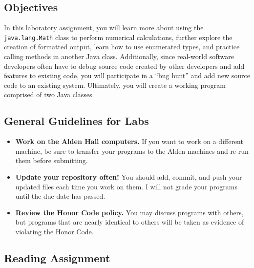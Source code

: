 



\subsection*{Objectives}

In this laboratory assignment, you will learn more about using the {\tt java.lang.Math} class to perform numerical
calculations, further explore the creation of formatted output, learn how to use enumerated types, and practice calling
methods in another Java class.  Additionally, since real-world software developers often have to debug source code
created by other developers and add features to existing code, you will participate in a ``bug hunt'' and add new
source code to an existing system. Ultimately, you will create a working program comprised of two Java classes.

\vspace*{-.1in}
\subsection*{General Guidelines for Labs}

\begin{itemize}
\item
{\bf Work on the Alden Hall computers.} If you want to work on a different
machine, be sure to transfer your programs to the Alden
machines and re-run them before submitting.
\item
{\bf Update your repository often!} You should add, commit, 
and push your updated files each time you work on them.  I will not grade 
your programs until the due date has passed.
\item
{\bf Review the Honor Code policy.} You
may discuss programs with others, but programs that are nearly identical
to others will be taken as evidence of violating the Honor Code.
\end{itemize}

\vspace*{-.2in}
\subsection*{Reading Assignment}

